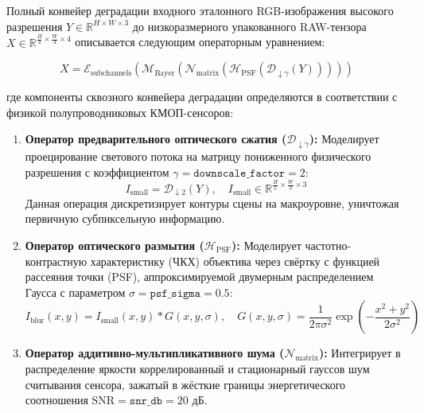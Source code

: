 \documentclass[12pt,a4paper]{article}
\begin{document}
Полный конвейер деградации входного эталонного RGB-изображения высокого разрешения $Y \in \mathbb{R}^{H \times W \times 3}$ до низкоразмерного упакованного RAW-тензора $X \in \mathbb{R}^{\frac{H}{4} \times \frac{W}{4} \times 4}$ описывается следующим операторным уравнением:

\begin{equation}
X = \mathcal{E}_{\text{subchannels}} \left( \mathcal{M}_{\text{Bayer}} \left( \mathcal{N}_{\text{matrix}} \left( \mathcal{H}_{\text{PSF}} \left( \mathcal{D}_{\downarrow \gamma} (Y) \right) \right) \right) \right)
\end{equation}

где компоненты сквозного конвейера деградации определяются в соответствии с физикой полупроводниковых КМОП-сенсоров:

\begin{enumerate}
    \item \textbf{Оператор предварительного оптического сжатия ($\mathcal{D}_{\downarrow \gamma}$):} Моделирует проецирование светового потока на матрицу пониженного физического разрешения с коэффициентом $\gamma = \texttt{downscale\_factor} = 2$:
    \begin{equation}
    I_{\text{small}} = \mathcal{D}_{\downarrow 2}(Y), \quad I_{\text{small}} \in \mathbb{R}^{\frac{H}{2} \times \frac{W}{2} \times 3}
    \end{equation}
    Данная операция дискретизирует контуры сцены на макроуровне, уничтожая первичную субпиксельную информацию.
    
    \item \textbf{Оператор оптического размытия ($\mathcal{H}_{\text{PSF}}$):} Моделирует частотно-контрастную характеристику (ЧКХ) объектива через свёртку с функцией рассеяния точки (PSF), аппроксимируемой двумерным распределением Гаусса с параметром $\sigma = \texttt{psf\_sigma} = 0.5$:
    \begin{equation}
    I_{\text{blur}}(x,y) = I_{\text{small}}(x,y) * G(x,y, \sigma), \quad G(x,y,\sigma) = \frac{1}{2\pi\sigma^2}\exp\left(-\frac{x^2+y^2}{2\sigma^2}\right)
    \end{equation}
    
    \item \textbf{Оператор аддитивно-мультипликативного шума ($\mathcal{N}_{\text{matrix}}$):} Интегрирует в распределение яркости коррелированный и стационарный гауссов шум считывания сенсора, зажатый в жёсткие границы энергетического соотношения $\text{SNR} = \texttt{snr\_db} = 20$ дБ.
    

\end{enumerate}
\end{document}
